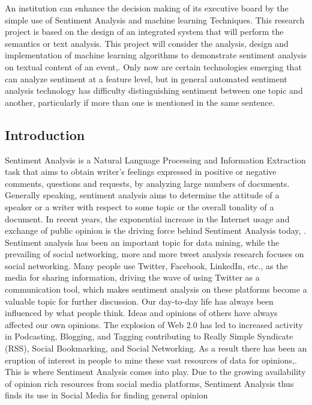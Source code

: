 An institution can enhance the decision making of its executive board by the simple use of Sentiment Analysis and machine learning Techniques. This research project is based on the design of an integrated system that will perform the semantics or text analysis. This project will consider the analysis, design and implementation of machine learning algorithms to demonstrate sentiment analysis on textual content of an event,\cite{ref19}.
Only now are certain technologies emerging that can analyze sentiment at a feature level, but in general automated sentiment analysis technology has difficulty distinguishing sentiment between one topic and another, particularly if more than one is mentioned in the same sentence. 
\leavevmode\\

\subsection{Introduction}
Sentiment Analysis is a Natural Language Processing and Information Extraction task that aims
to obtain writer’s feelings expressed in positive or negative comments, questions and
requests, by analyzing large numbers of documents. Generally speaking, sentiment analysis aims
to determine the attitude of a speaker or a writer with respect to some topic or the overall tonality
of a document. In recent years, the exponential increase in the Internet usage and exchange
of public opinion is the driving force behind Sentiment Analysis today, \cite{ref23}.
Sentiment analysis has been an important topic for data mining, while the prevailing of
social networking, more and more tweet analysis research focuses on social networking. Many
people use Twitter, Facebook, LinkedIn, etc., as the media for sharing information, driving the
wave of using Twitter as a communication tool, which makes sentiment analysis on these platforms
become a valuable topic for further discussion.
Our day-to-day life has always been influenced by what people think. Ideas and opinions of others
have always affected our own opinions. The explosion of Web 2.0 has led to increased activity in
Podcasting, Blogging, and Tagging contributing to Really Simple Syndicate (RSS), Social
Bookmarking, and Social Networking. As a result there has been an eruption of interest in people
to mine these vast resources of data for opinions,\cite{ref23}. This is where Sentiment
Analysis comes into play. Due to the growing availability of opinion rich resources from social
media platforms, Sentiment Analysis thus finds its use in Social Media for finding general opinion
